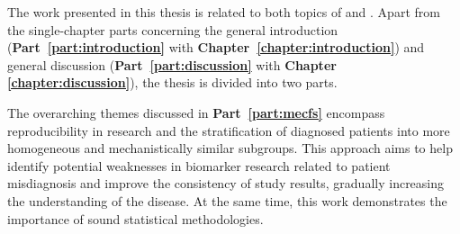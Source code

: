 

The work presented in this thesis is related to both topics of \cfs and \covid.
Apart from the single-chapter parts concerning the general introduction (\textbf{Part~\ref{part:introduction}} with \textbf{Chapter~\ref{chapter:introduction}}) and general discussion (\textbf{Part~\ref{part:discussion}} with \textbf{Chapter \ref{chapter:discussion}}), the thesis is divided into two parts.

The overarching themes discussed in \textbf{Part~\ref{part:mecfs}} encompass reproducibility in \cfs research and the stratification of diagnosed patients into more homogeneous and mechanistically similar subgroups. This approach aims to help identify potential weaknesses in biomarker research related to patient misdiagnosis and improve the consistency of study results, gradually increasing the understanding of the disease. At the same time, this work demonstrates the importance of sound statistical methodologies.

